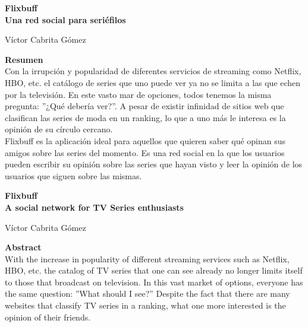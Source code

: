 \thispagestyle{empty}

\begin{center}
{\large\bfseries Flixbuff \\ Una red social para seriéfilos }\\
\end{center}
\begin{center}
Víctor Cabrita Gómez\\
\end{center}

\vspace{0.7cm}

\noindent\textbf{Resumen}\\

Con la irrupción y popularidad de diferentes servicios de streaming como Netflix, HBO, etc. el catálogo de series que uno puede ver ya no se limita a las que echen por la televisión. En este vasto mar de opciones, todos tenemos la misma pregunta: ''¿Qué debería ver?''. A pesar de existir infinidad de sitios web que clasifican las series de moda en un ranking, lo que a uno más le interesa es la opinión de su círculo cercano.\\

Flixbuff es la aplicación ideal para aquellos que quieren saber qué opinan sus amigos sobre las series del momento. Es una red social en la que los usuarios pueden escribir su opinión sobre las series que hayan visto y leer la opinión de los usuarios que siguen sobre las mismas.

\cleardoublepage{}

\begin{center}
	{\large\bfseries Flixbuff \\ A social network for TV Series enthusiasts}\\
\end{center}
\begin{center}
	Víctor Cabrita Gómez\\
\end{center}
\vspace{0.7cm}

\noindent\textbf{Abstract}\\

With the increase in popularity of different streaming services such as Netflix, HBO, etc. the catalog of TV series that one can see already no longer limits itself to those that broadcast on television. In this vast market of options, everyone has the same question: ''What should I see?'' Despite the fact that there are many websites that classify TV series in a ranking, what one more interested is the opinion of their friends.\\

